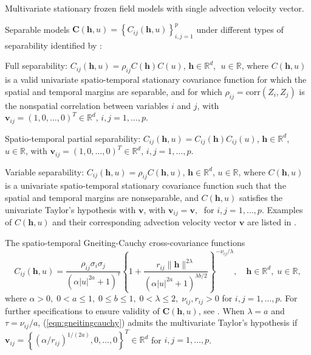 \documentclass[12pt]{article}
\newcommand{\0}{\mathbf{0}}
\begin{document}
\begin{compactenum}
\item Multivariate stationary frozen field models with single advection velocity vector.

\item Separable models $\mathbf{C}(\mathbf{h},u)=\left\{C_{ij}(\mathbf{h},u)\right\}_{i,j=1}^{p}$ under different types of separability identified by \citet{apanasovich2010cross}: 
\begin{compactenum}
\item Full separability:
$C_{ij}(\mathbf{h},u)=\rho_{ij}C(\mathbf{h})C(u)$, $\mathbf{h}\in \mathbb{R}^d$, $\;u\in \mathbb{R}$,
where $C(\mathbf{h},u)$ is a valid univariate spatio-temporal stationary covariance function for which the spatial and temporal margins are separable, and for which $\rho_{ij}=\text{corr}(Z_i,Z_j)$ is the nonspatial correlation between variables $i$ and $j$, with $\mathbf{v}_{ij}=(1,0,\ldots,0)^T \in \mathbb{R}^d$, $i,j=1,\ldots,p$. 
\item Spatio-temporal partial separability:
$C_{ij}(\mathbf{h},u)=C_{ij}(\mathbf{h})C_{ij}(u)$, $\mathbf{h}\in \mathbb{R}^d$, $u\in \mathbb{R}$,
with $\mathbf{v}_{ij}=(1,0,\ldots,0)^T \in \mathbb{R}^d$, $i,j=1,\ldots,p$. 
\item Variable separability:
$C_{ij}(\mathbf{h},u)=\rho_{ij}C(\mathbf{h},u)$, $\mathbf{h}\in \mathbb{R}^d$, $u\in \mathbb{R}$,
where $C(\mathbf{h},u)$ is a univariate spatio-temporal stationary covariance function such that the spatial and temporal margins are nonseparable, and $C(\mathbf{h},u)$ satisfies the univariate Taylor's hypothesis with $\mathbf{v}$, with $\mathbf{v}_{ij}=\mathbf{v},\;$ for $i,j=1,\ldots,p$. Examples of $C(\mathbf{h},u)$ and their corresponding advection velocity vector $\mathbf{v}$ are listed in \citet{gneiting2006geostatistical}.
\end{compactenum}

\item The spatio-temporal Gneiting-Cauchy cross-covariance functions 
\begin{equation}\label{eqn:gneitingcauchy}
C_{ij}(\mathbf{h},u)=\frac{\rho_{ij}\sigma_{i}\sigma_{j}}{(\alpha |u|^{2a}+1)^{\tau}}\left\{1+\frac{r_{ij}\|\mathbf{h}\|^{2\lambda}}{(\alpha|u|^{2a}+1)^{\lambda b/2}}\right\}^{-\nu_{ij}/\lambda},\quad \mathbf{h}\in \mathbb{R}^d,\;u\in \mathbb{R},
\end{equation}
where $\alpha>0,\;0<a\leq 1,\;0\leq b\leq 1,\;0<\lambda\leq 2,\;\nu_{ij},r_{ij}>0$ for $i,j=1,\ldots,p$. For further specifications to ensure validity of $\mathbf{C}(\mathbf{h},u)$, see \citet{bourotte2016flexible}. When $\lambda=a$ and $\tau=\nu_{ij}/a$, (\ref{eqn:gneitingcauchy}) admits the multivariate Taylor's hypothesis if $\mathbf{v}_{ij}=\left\{(\alpha/r_{ij})^{1/(2a)},0,\ldots,0\right\}^T\in \mathbb{R}^d$ for $i,j=1,\ldots,p$.
\end{compactenum}
\end{document}
